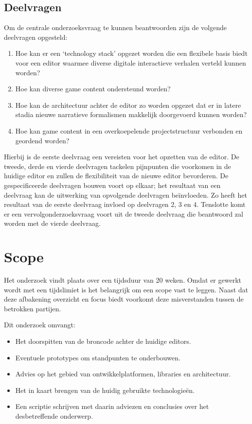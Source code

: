 \subsection{Deelvragen}
Om de centrale onderzoeksvraag te kunnen beantwoorden zijn de volgende deelvragen opgesteld:
\begin{enumerate}
    \item Hoe kan er een ‘technology stack’ opgezet worden die een flexibele basis biedt voor een editor waarmee diverse digitale interactieve verhalen verteld kunnen worden?
    \item Hoe kan diverse game content ondersteund worden?
    \item Hoe kan de architectuur achter de editor zo worden opgezet dat er in latere stadia nieuwe narratieve formalismen makkelijk doorgevoerd kunnen worden?
    \item Hoe kan game content in een overkoepelende projectstructuur verbonden en geordend worden?
\end{enumerate}
Hierbij is de eerste deelvraag een vereisten voor het opzetten van de editor. De tweede, derde en vierde deelvragen tackelen pijnpunten die voorkomen in de huidige editor en zullen de flexibiliteit van de nieuwe editor bevorderen. De gespecificeerde deelvragen bouwen voort op elkaar; het resultaat van een deelvraag kan de uitwerking van opvolgende deelvragen beïnvloeden. Zo heeft het resultaat van de eerste deelvraag invloed op deelvragen 2, 3 en 4. Tenslotte komt er een vervolgonderzoeksvraag voort uit de tweede deelvraag die beantwoord zal worden met de vierde deelvraag.

\section{Scope}
Het onderzoek vindt plaats over een tijdsduur van 20 weken. Omdat er gewerkt wordt met een tijdslimiet is het belangrijk om een scope vast te leggen. Naast dat deze afbakening overzicht en focus biedt voorkomt deze misverstanden tussen de betrokken partijen.

\noindent Dit onderzoek omvangt:
\begin{itemize}
    \item Het doorspitten van de broncode achter de huidige editors.
    \item Eventuele prototypes om standpunten te onderbouwen.
    \item Advies op het gebied van ontwikkelplatformen, libraries en architectuur.
    \item Het in kaart brengen van de huidig gebruikte technologieën.
    \item Een scriptie schrijven met daarin adviezen en conclusies over het desbetreffende onderwerp.
\end{itemize}

